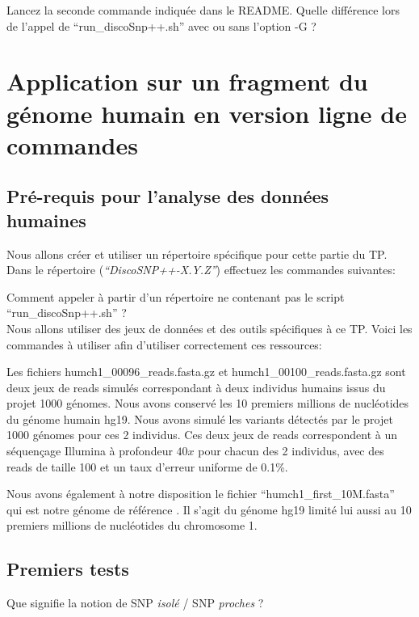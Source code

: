 \qu {} Lancez la seconde commande indiquée dans le README. Quelle différence lors de l'appel de ``run\_discoSnp++.sh'' avec ou sans l'option -G ?

\section*{Application sur un fragment du génome humain en version ligne de commandes}

\subsection*{Pré-requis pour l'analyse des données humaines}
Nous allons créer et utiliser un répertoire spécifique pour cette partie du TP. Dans le répertoire (\emph{``DiscoSNP++-X.Y.Z''}) effectuez les commandes suivantes:

\qu {} Comment appeler \discopp à partir d'un répertoire ne contenant pas le script ``run\_discoSnp++.sh'' ?\\

Nous allons utiliser des jeux de données et des outils spécifiques à ce TP. Voici les commandes à utiliser afin d'utiliser correctement ces ressources:
        
        
        
Les fichiers humch1\_00096\_reads.fasta.gz et humch1\_00100\_reads.fasta.gz sont deux jeux de reads simulés correspondant à deux individus humains issus du projet 1000 génomes.  Nous avons conservé les 10  premiers millions de nucléotides du génome humain hg19. Nous avons simulé les variants détectés par le projet 1000 génomes pour ces 2 individus. Ces deux jeux de reads correspondent à un séquençage Illumina à profondeur $40x$ pour chacun des 2 individus, avec des reads de taille 100 et un taux d'erreur uniforme de 0.1\%.



Nous avons également à notre disposition le fichier ``humch1\_first\_10M.fasta'' qui est notre génome de référence . Il s'agit du génome hg19 limité lui aussi au 10  premiers millions de nucléotides du chromosome 1.


\subsection*{Premiers tests}
\qu Que signifie la notion de SNP \emph{isolé} / SNP \emph{proches} ?


